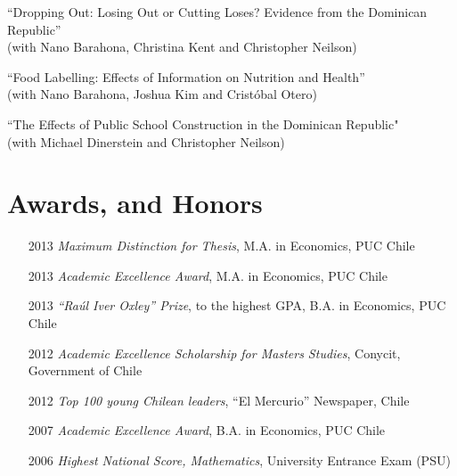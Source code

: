 \documentclass[margin,line]{res}
\begin{document}
\begin{resume}

``Dropping Out: Losing Out or Cutting Loses? Evidence from the Dominican Republic'' \\
(with Nano Barahona, Christina Kent and Christopher Neilson)

``Food Labelling: Effects of Information on Nutrition and Health'' \\ (with Nano Barahona, Joshua Kim and Crist\'obal Otero)

``The Effects of Public School Construction in the Dominican Republic"\\
(with Michael Dinerstein and Christopher Neilson)


\section{\sc Awards, and Honors} 
\begin{itemize}[style=multiline,leftmargin=1.2cm,font=\normalfont]
\item[2013] {\em Maximum Distinction for Thesis}, M.A. in Economics, PUC Chile
\item[2013] {\em Academic Excellence Award}, M.A. in Economics, PUC Chile 
\item[2013] {\em ``Ra\'ul Iver Oxley'' Prize}, to the highest GPA, B.A. in Economics, PUC Chile
\item[2012] {\em Academic Excellence Scholarship for Masters Studies}, Conycit, Government of Chile 
\item[2012] {\em Top 100 young Chilean leaders}, ``El Mercurio'' Newspaper, Chile %
\item[2007] {\em Academic Excellence Award}, B.A. in Economics, PUC Chile
\item[2006] {\em Highest National Score, Mathematics}, University Entrance Exam (PSU) 
\end{itemize}


\end{resume}
\end{document}
